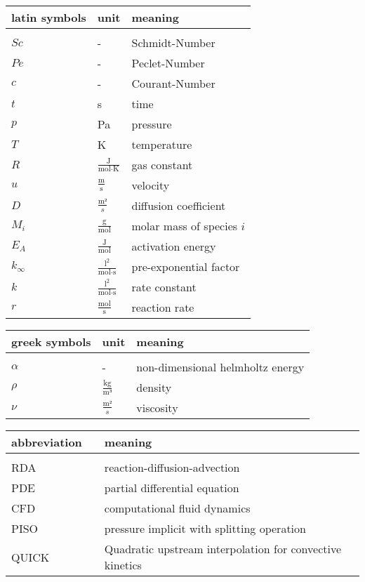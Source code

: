 \documentclass[../thesis.tex]{subfiles}
\begin{document}
	

\renewcommand*{\arraystretch}{1.2}
\small
\begin{tabular}{p{4cm}p{3cm}p{8cm}}
	\textbf{latin symbols} & \textbf{unit} & \textbf{meaning} \\ 
	\hline \\[\dimexpr-\normalbaselineskip+2pt]
	$Sc$ & - & Schmidt-Number \\
	$Pe$ & - & Peclet-Number \\
	$c$ & - & Courant-Number \\
	$t$ & s & time \\
	$p$ & Pa & pressure \\
	$T$ & K & temperature \\
	$R$ & $\frac{\text{J}}{\text{mol} \cdot \text{K}}$ & gas constant \\
	$u$ & $\frac{\text{m}}{\text{s}}$ & velocity \\
	$D$ & $\frac{\text{m²}}{s}$ & diffusion coefficient\\
	$M_i$ & $\frac{\text{g}}{\text{mol}}$ & molar mass of species $i$\\
	$E_A$ & $\frac{\text{J}}{\text{mol}}$ & activation energy \\
	$k_{\infty}$ & $\frac{\text{l}^2}{\text{mol} \cdot \text{s}}$ & pre-exponential factor \\
	$k$ & $\frac{\text{l}^2}{\text{mol} \cdot \text{s}}$ & rate constant \\
	$r$ & $\frac{\text{mol}}{\text{s}}$ & reaction rate \\
\end{tabular}
\vspace{1cm}

\small
\begin{tabular}{p{4cm}p{3cm}p{8cm}}
	\textbf{greek symbols} & \textbf{unit} & \textbf{meaning} \\ 
	\hline \\[\dimexpr-\normalbaselineskip+2pt] 
	$\alpha$ & - & non-dimensional helmholtz energy \\
	$\rho$ & $\frac{\text{kg}}{\text{m³}}$ & density \\
	$\nu$ & $\frac{\text{m²}}{s}$ & viscosity\\
\end{tabular}
\vspace{1cm}

\small
\begin{tabular}{p{4cm}p{3cm}p{8cm}}
	\textbf{abbreviation} & & \textbf{meaning} \\ 
	\hline \\[\dimexpr-\normalbaselineskip+2pt] 
	RDA & & reaction-diffusion-advection \\
	PDE & & partial differential equation \\
	CFD && computational fluid dynamics \\
	PISO & & pressure implicit with splitting operation \\
	QUICK & & Quadratic upstream interpolation for convective kinetics \\
\end{tabular}

\listoffigures
\listoftables
\end{document}
